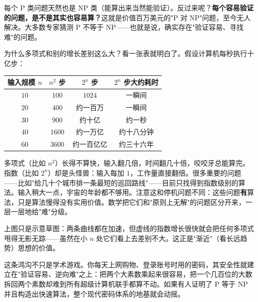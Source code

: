 每个 P 类问题天然也是 NP 类（能算出来当然能验证）。反过来呢？\textbf{每个容易验证的问题，是不是其实也容易算？}这就是价值百万美元的"P 对 NP"问题，至今无人解决。大多数专家猜测 P 不等于 NP——也就是说，确实存在"验证容易、寻找难"的问题。

为什么多项式和别的增长差别这么大？看一张表就明白了。假设计算机每秒执行十亿步：

\begin{center}
\begin{tabular}{cccc}
\toprule
输入规模 $n$ & $n^2$ 步 & $2^n$ 步 & $2^n$ 步大约耗时 \\
\midrule
$10$ & $100$ & $1024$ & 一瞬间 \\
$20$ & $400$ & 约一百万 & 一瞬间 \\
$30$ & $900$ & 约十亿 & 约一秒 \\
$40$ & $1600$ & 约一万亿 & 约十八分钟 \\
$60$ & $3600$ & 约一百亿亿 & 约三十六年 \\
\bottomrule
\end{tabular}
\end{center}

多项式（比如 $n^2$）长得不算快，输入翻几倍，时间翻几十倍，咬咬牙总能算完。指数（比如 $2^n$）却是头怪兽：输入每加 $1$，工作量直接翻倍。很多重要的问题——比如"给几十个城市排一条最短的巡回路线"——目前只找得到指数级别的算法。输入稍大一点，宇宙的年龄都不够用。注意这和停机问题不同：这些问题\textbf{有}算法，只是算法慢得没有实用价值。数学把它们和"原则上无解"的问题区分开来，一层一层地给"难"分级。

\begin{center}
\end{center}

\begin{zhu}
上图只是示意草图：两条曲线都在加速，但虚线的指数增长很快就会把任何多项式甩得无影无踪——虽然在小 $n$ 处它们看上去差别不大。这正是"渐近"（看长远趋势）思想的价值。
\end{zhu}

这条鸿沟不只是学术游戏。你每天上网购物、登录账号时用的密码，其安全性就建立在"验证容易、逆向难"之上：把两个大素数乘起来很容易，把一个几百位的大数拆回两个素数却难到所有超级计算机联手都算不动。如果有人证明了 P 等于 NP 并且构造出快速算法，整个现代密码体系的地基就会动摇。

